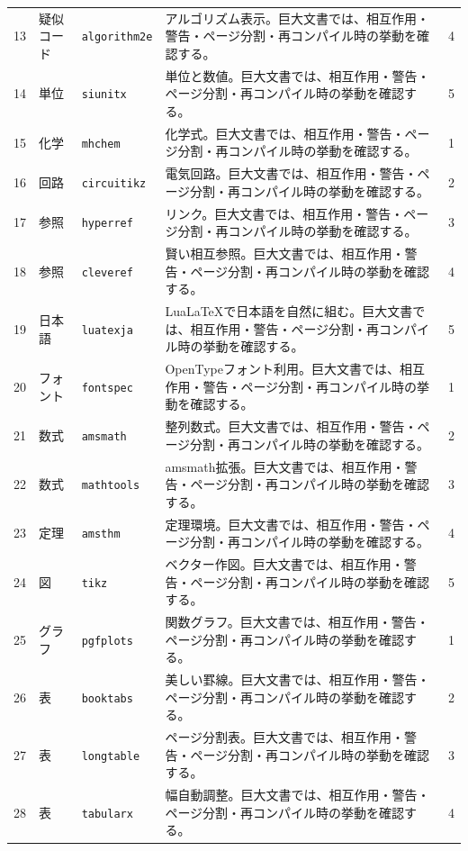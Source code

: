 \documentclass[12pt,a4paper,openany]{ltjsbook}
\theoremstyle{definition}
\theoremstyle{plain}
\theoremstyle{remark}
\begin{document}
\begin{landscape}
\begin{longtable}{llp{55mm}p{80mm}r}
13 & 疑似コード & \texttt{algorithm2e} & アルゴリズム表示。巨大文書では、相互作用・警告・ページ分割・再コンパイル時の挙動を確認する。 & 4\\
14 & 単位 & \texttt{siunitx} & 単位と数値。巨大文書では、相互作用・警告・ページ分割・再コンパイル時の挙動を確認する。 & 5\\
15 & 化学 & \texttt{mhchem} & 化学式。巨大文書では、相互作用・警告・ページ分割・再コンパイル時の挙動を確認する。 & 1\\
16 & 回路 & \texttt{circuitikz} & 電気回路。巨大文書では、相互作用・警告・ページ分割・再コンパイル時の挙動を確認する。 & 2\\
17 & 参照 & \texttt{hyperref} & リンク。巨大文書では、相互作用・警告・ページ分割・再コンパイル時の挙動を確認する。 & 3\\
18 & 参照 & \texttt{cleveref} & 賢い相互参照。巨大文書では、相互作用・警告・ページ分割・再コンパイル時の挙動を確認する。 & 4\\
19 & 日本語 & \texttt{luatexja} & LuaLaTeXで日本語を自然に組む。巨大文書では、相互作用・警告・ページ分割・再コンパイル時の挙動を確認する。 & 5\\
20 & フォント & \texttt{fontspec} & OpenTypeフォント利用。巨大文書では、相互作用・警告・ページ分割・再コンパイル時の挙動を確認する。 & 1\\
21 & 数式 & \texttt{amsmath} & 整列数式。巨大文書では、相互作用・警告・ページ分割・再コンパイル時の挙動を確認する。 & 2\\
22 & 数式 & \texttt{mathtools} & amsmath拡張。巨大文書では、相互作用・警告・ページ分割・再コンパイル時の挙動を確認する。 & 3\\
23 & 定理 & \texttt{amsthm} & 定理環境。巨大文書では、相互作用・警告・ページ分割・再コンパイル時の挙動を確認する。 & 4\\
24 & 図 & \texttt{tikz} & ベクター作図。巨大文書では、相互作用・警告・ページ分割・再コンパイル時の挙動を確認する。 & 5\\
25 & グラフ & \texttt{pgfplots} & 関数グラフ。巨大文書では、相互作用・警告・ページ分割・再コンパイル時の挙動を確認する。 & 1\\
26 & 表 & \texttt{booktabs} & 美しい罫線。巨大文書では、相互作用・警告・ページ分割・再コンパイル時の挙動を確認する。 & 2\\
27 & 表 & \texttt{longtable} & ページ分割表。巨大文書では、相互作用・警告・ページ分割・再コンパイル時の挙動を確認する。 & 3\\
28 & 表 & \texttt{tabularx} & 幅自動調整。巨大文書では、相互作用・警告・ページ分割・再コンパイル時の挙動を確認する。 & 4\\

\end{longtable}
\end{landscape}
\end{document}
